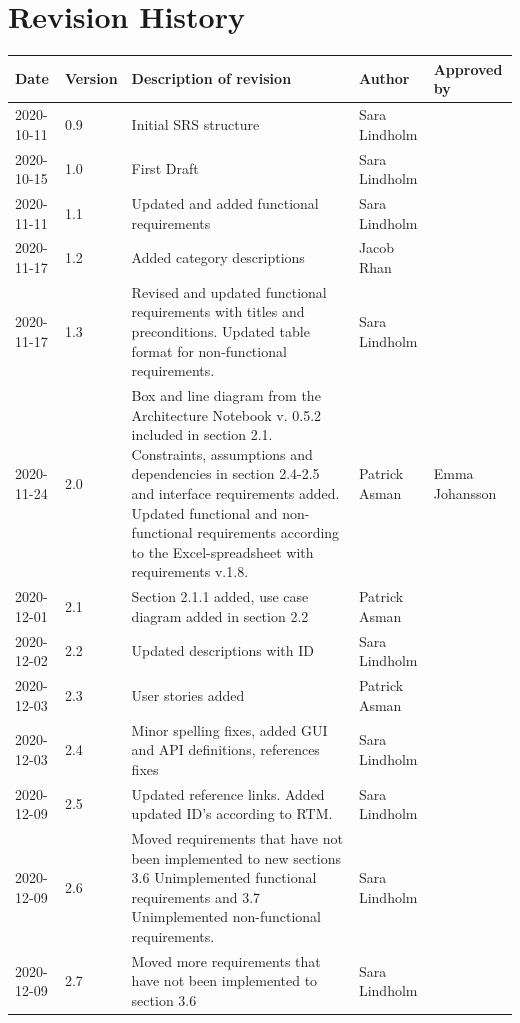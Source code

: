 \documentclass{scrreprt}
\begin{document}
\chapter*{Revision History}
\begin{center}
\begin{tabularx}{\linewidth}{|p{}|p{}|p{4.6cm}|p{2.5cm}|p{2.5cm}|}
 \hline
 \textbf{Date} & \textbf{Version} & \textbf{Description of revision} & \textbf{Author} & \textbf{Approved by} \\ 
 \hline
 2020-10-11 & 0.9 & Initial SRS structure & Sara Lindholm & \\
 \hline
 2020-10-15 & 1.0 & First Draft & Sara Lindholm & \\ 
 \hline
 2020-11-11 & 1.1 & Updated and added functional requirements & Sara Lindholm & \\
 \hline
 2020-11-17 & 1.2 & Added category descriptions & Jacob Rhan & \\
 \hline
 2020-11-17 & 1.3 & Revised and updated functional requirements with titles and preconditions. Updated table format for non-functional requirements. & Sara Lindholm & \\
 \hline 
 2020-11-24 & 2.0 & Box and line diagram from the Architecture Notebook v. 0.5.2 included in section 2.1. Constraints, assumptions and dependencies in section 2.4-2.5 and interface requirements added. Updated functional and non-functional requirements according to the Excel-spreadsheet with requirements v.1.8. & Patrick Asman & Emma Johansson \\
 \hline
 2020-12-01 & 2.1 & Section 2.1.1 added, use case diagram added in section 2.2 & Patrick Asman & \\
 \hline 
 2020-12-02 & 2.2 & Updated descriptions with ID & Sara Lindholm & \\
 \hline 
 2020-12-03 & 2.3 & User stories added & Patrick Asman & \\ 
 \hline 
 2020-12-03 & 2.4 & Minor spelling fixes, added GUI and API definitions, references fixes & Sara Lindholm & \\ 
 \hline 
 2020-12-09 & 2.5 & Updated reference links. Added updated ID's according to RTM. & Sara Lindholm & \\
 \hline 
 2020-12-09 & 2.6 & Moved requirements that have not been implemented to new sections 3.6 Unimplemented functional requirements and 3.7 Unimplemented non-functional requirements. & Sara Lindholm & \\
 \hline
 2020-12-09 & 2.7 & Moved more requirements that have not been implemented to section 3.6 & Sara Lindholm & \\
 \hline
\end{tabularx}
\end{center}
\end{document}
